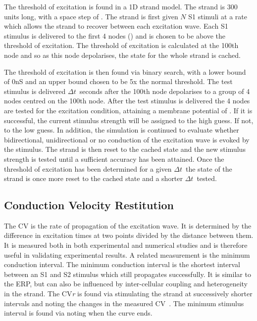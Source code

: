 The threshold of excitation is found in a 1D strand model.  The strand is 300
units long, with a space step of .  The strand is first given $N$ S1
stimuli at a rate which allows the strand to recover between each excitation
wave.  Each S1 stimulus is delivered to the first 4 nodes () and is
chosen to be above the threshold of excitation.  The threshold of excitation is
calculated at the 100th node and so as this node depolarises, the state for the
whole strand is cached.

The threshold of excitation is then found via binary search, with a lower bound
of \unit{0}{nS} and an upper bound chosen to be 5x the normal threshold.  The
test stimulus is delivered $\Delta t$\ seconds after the 100th node depolarises
to a group of 4 nodes centred on the 100th node.  After the test stimulus is
delivered the 4 nodes are tested for the excitation condition, attaining a
membrane potential of .  If it is successful, the current stimulus
strength will be assigned to the high guess.  If not, to the low guess.  In
addition, the simulation is continued to evaluate whether bidirectional,
unidirectional or no conduction of the excitation wave is evoked by the
stimulus.  The strand is then reset to the cached state and the new stimulus
strength is tested until a sufficient accuracy has been attained.  Once the
threshold of excitation has been determined for a given $\Delta t$\ the state of
the strand is once more reset to the cached state and a shorter $\Delta t$\
tested.

\subsection{Conduction Velocity Restitution}

The CV is the rate of propagation of the excitation wave.
It is determined by the difference in excitation times at two points divided by
the distance between them.
It is measured both in both experimental and numerical studies and is therefore
useful in validating experimental results.
A related measurement is the minimum conduction interval.
The minimum conduction interval is the shortest interval between an S1 and S2
stimulus which still propagates successfully.
It is similar to the ERP, but can also be influenced by inter-cellular coupling
and heterogeneity in the strand.
The CV\emph{r} is found via stimulating the strand at successively shorter
intervals and noting the changes in the measured
CV~\cite{Cherry2008,Zhang2003,Qu2006}.
The minimum stimulus interval is found via noting when the curve ends.


